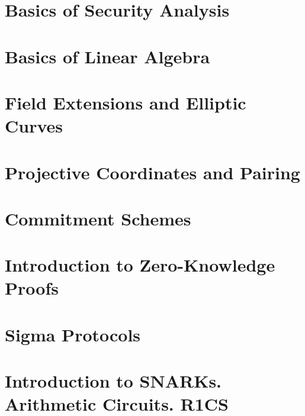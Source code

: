 \documentclass{zkdl-template}
\begin{document}
\section{Basics of Security Analysis}\label{section:math-crypto-2}



\section{Basics of Linear Algebra}\label{section:linear-algebra}



\section{Field Extensions and Elliptic Curves}\label{section:field_extensions}



\section{Projective Coordinates and Pairing}



\section{Commitment Schemes}\label{section:commitments}



\section{Introduction to Zero-Knowledge Proofs}\label{section:intro-zk}



\section{Sigma Protocols}\label{section:sigma}



\section{Introduction to SNARKs. Arithmetic Circuits. R1CS}\label{section:r1cs}
\end{document}
